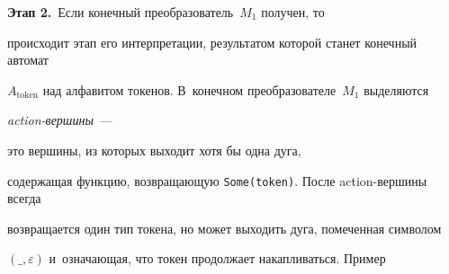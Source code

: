 \textbf{Этап 2.}\ Если конечный преобразователь~$M_1$ получен, то 


происходит этап его интерпретации, результатом которой станет конечный автомат 


$A_{\mathrm{token}}$ над алфавитом токенов.  В~конечном преобразователе~$M_1$ выделяются 


\textit{action-вер\-ши\-ны}~---\linebreak\vspace*{-12pt}





\renewcommand{\figurename}{\protect\bf Рис.}


\setcounter{figure}{0}










\noindent


 это вершины, из которых выходит хотя бы одна дуга, 


содержащая функцию, возвращающую \verb"Some(token)". После action-вер\-ши\-ны всегда 


возвращается один тип токена, но может выходить дуга, помеченная символом 


$(\_,\varepsilon )$ и~означающая, что токен продолжает накапливаться. Пример 


